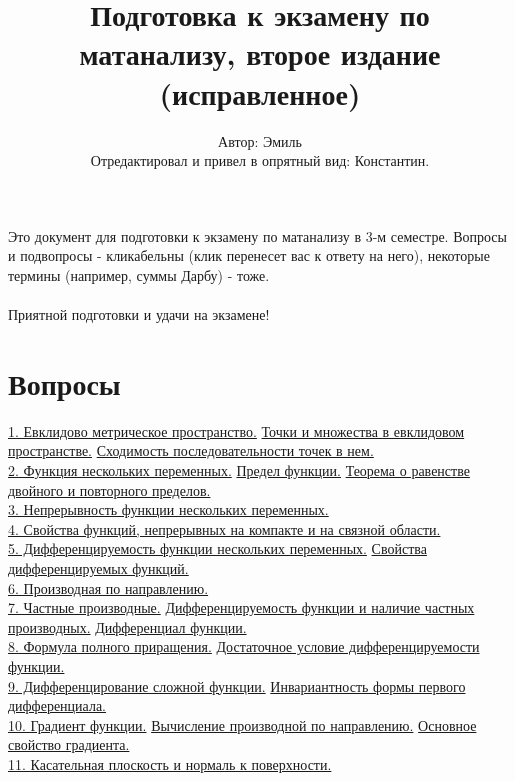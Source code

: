 \documentclass[12pt]{article}
\title{Подготовка к экзамену по матанализу, второе издание (исправленное)}
\author{Автор: Эмиль\\
\small{Отредактировал и привел в опрятный вид: Константин.}}
\begin{document}

\maketitle
Это документ для подготовки к экзамену по матанализу в 3-м семестре. Вопросы и подвопросы - кликабельны (клик перенесет вас к ответу на него), некоторые термины (например, суммы Дарбу) - тоже.\\\\
Приятной подготовки и удачи на экзамене!\\

\section{Вопросы}
\hyperref[question1_1]{1.	Евклидово метрическое пространство.} \hyperref[question1_2]{Точки и множества в евклидовом пространстве.} \hyperref[question1_3]{Сходимость последовательности точек в нем.}\\
\hyperref[question2_1]{2.	Функция нескольких переменных.} \hyperref[question2_2]{Предел функции.} \hyperref[question2_3]{Теорема о равенстве двойного и повторного пределов.}\\
\hyperref[question3]{3.	Непрерывность функции нескольких переменных.}\\
\hyperref[question4]{4.	Свойства функций, непрерывных на компакте и на связной области.}\\
\hyperref[question5_1]{5.	Дифференцируемость функции нескольких переменных.} \hyperref[question5_2]{Свойства дифференцируемых функций.}\\
\hyperref[question6]{6.	Производная по направлению.}\\
\hyperref[question7_1]{7.	Частные производные.} \hyperref[question7_2]{Дифференцируемость функции и наличие частных производных.} \hyperref[question7_3]{Дифференциал функции.}\\
\hyperref[question8_1]{8.	Формула полного приращения.} \hyperref[question8_2]{Достаточное условие дифференцируемости функции.}\\
\hyperref[question9_1]{9.	Дифференцирование сложной функции.} \hyperref[question9_2]{Инвариантность формы первого дифференциала.}\\
\hyperref[question10_1]{10.	Градиент функции.} \hyperref[question10_2]{Вычисление производной по направлению.} \hyperref[question10_3]{Основное свойство градиента.}\\
\hyperref[question11]{11.	Касательная плоскость и нормаль к поверхности.}\\
\end{document}
